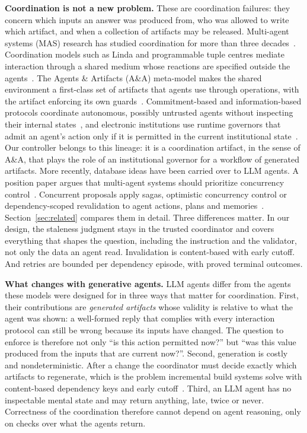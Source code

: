 \textbf{Coordination is not a new problem.} These are coordination failures: they concern which inputs an answer was produced from, who was allowed to write which artifact, and when a collection of artifacts may be released. Multi-agent systems (MAS) research has studied coordination for more than three decades~\cite{malone1994coordination,jennings1993commitments,omicini2001coordination}. Coordination models such as Linda and programmable tuple centres mediate interaction through a shared medium whose reactions are specified outside the agents~\cite{gelernter1985linda,gelernter1992coordination,omicini2001tuple}. The Agents \& Artifacts (A\&A) meta-model makes the shared environment a first-class set of artifacts that agents use through operations, with the artifact enforcing its own guards~\cite{omicini2008artifacts,weyns2007environment,ricci2011environment}. Commitment-based and information-based protocols coordinate autonomous, possibly untrusted agents without inspecting their internal states~\cite{singh1998acl,yolum2002commitments,singh2011bspl,singh2020clouseau}, and electronic institutions use runtime governors that admit an agent's action only if it is permitted in the current institutional state~\cite{esteva2001institutions,arcos2005institutions}. Our controller belongs to this lineage: it is a coordination artifact, in the sense of A\&A, that plays the role of an institutional governor for a workflow of generated artifacts. More recently, database ideas have been carried over to LLM agents. A position paper argues that multi-agent systems should prioritize concurrency control~\cite{yang2026concurrency}. Concurrent proposals apply sagas, optimistic concurrency control or dependency-scoped revalidation to agent actions, plans and memories~\cite{chang2025sagallm,lyu2026coagent,chen2026planfence,li2026memtx}. Section~\ref{sec:related} compares them in detail. Three differences matter. In our design, the staleness judgment stays in the trusted coordinator and covers everything that shapes the question, including the instruction and the validator, not only the data an agent read. Invalidation is content-based with early cutoff. And retries are bounded per dependency episode, with proved terminal outcomes.

\textbf{What changes with generative agents.} LLM agents differ from the agents these models were designed for in three ways that matter for coordination. First, their contributions are \emph{generated artifacts} whose validity is relative to what the agent was shown: a well-formed reply that complies with every interaction protocol can still be wrong because its inputs have changed. The question to enforce is therefore not only ``is this action permitted now?'' but ``was this value produced from the inputs that are current now?''. Second, generation is costly and nondeterministic. After a change the coordinator must decide exactly which artifacts to regenerate, which is the problem incremental build systems solve with content-based dependency keys and early cutoff~\cite{mokhov,erdweg2015pluto}. Third, an LLM agent has no inspectable mental state and may return anything, late, twice or never. Correctness of the coordination therefore cannot depend on agent reasoning, only on checks over what the agents return.

